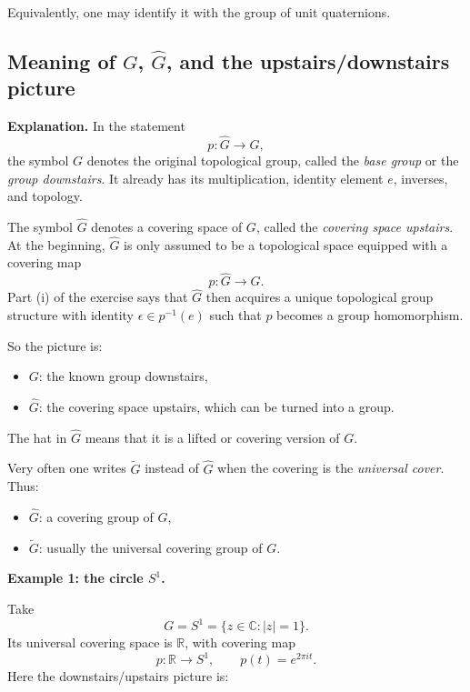 \documentclass[12pt,a4paper]{article}
\theoremstyle{notespace}
\begin{document}
Equivalently, one may identify it with the group of unit quaternions.

\subsection{Meaning of \(G\), \(\widehat{G}\), and the upstairs/downstairs picture}

\textbf{Explanation.}
In the statement
\[
p:\widehat{G}\to G,
\]
the symbol \(G\) denotes the original topological group, called the \emph{base group} or the \emph{group downstairs}. It already has its multiplication, identity element \(e\), inverses, and topology.

The symbol \(\widehat{G}\) denotes a covering space of \(G\), called the \emph{covering space upstairs}. At the beginning, \(\widehat{G}\) is only assumed to be a topological space equipped with a covering map
\[
p:\widehat{G}\to G.
\]
Part (i) of the exercise says that \(\widehat{G}\) then acquires a unique topological group structure with identity \(\epsilon\in p^{-1}(e)\) such that \(p\) becomes a group homomorphism.

So the picture is:

\begin{itemize}
	\item \(G\): the known group downstairs,
	\item \(\widehat{G}\): the covering space upstairs, which can be turned into a group.
\end{itemize}

The hat in \(\widehat{G}\) means that it is a lifted or covering version of \(G\).

Very often one writes \(\widetilde{G}\) instead of \(\widehat{G}\) when the covering is the \emph{universal cover}. Thus:

\begin{itemize}
	\item \(\widehat{G}\): a covering group of \(G\),
	\item \(\widetilde{G}\): usually the universal covering group of \(G\).
\end{itemize}

\medskip

\textbf{Example 1: the circle \(S^1\).}

Take
\[
G=S^1=\{z\in \mathbb C:|z|=1\}.
\]
Its universal covering space is \(\mathbb R\), with covering map
\[
p:\mathbb R\to S^1,
\qquad
p(t)=e^{2\pi i t}.
\]
Here the downstairs/upstairs picture is:
\end{document}
